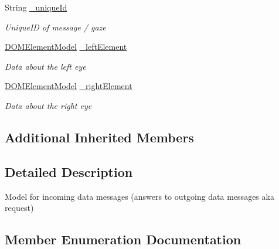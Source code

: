 \begin{DoxyCompactItemize}
String \hyperlink{class_web_analyzer_1_1_models_1_1_message_model_1_1_in_data_message_a65f5749322bf4e7ac43c6a4bf2702a55}{\+\_\+unique\+Id}
\begin{DoxyCompactList}\small\item\em Unique\+I\+D of message / gaze \end{DoxyCompactList}\item 
\hyperlink{class_web_analyzer_1_1_models_1_1_data_model_1_1_d_o_m_element_model}{D\+O\+M\+Element\+Model} \hyperlink{class_web_analyzer_1_1_models_1_1_message_model_1_1_in_data_message_a95db3eadcb298b75ea183c5bbf042a57}{\+\_\+left\+Element}
\begin{DoxyCompactList}\small\item\em Data about the left eye \end{DoxyCompactList}\item 
\hyperlink{class_web_analyzer_1_1_models_1_1_data_model_1_1_d_o_m_element_model}{D\+O\+M\+Element\+Model} \hyperlink{class_web_analyzer_1_1_models_1_1_message_model_1_1_in_data_message_a888d6b4c7153dd3e469cd963567fb7c7}{\+\_\+right\+Element}
\begin{DoxyCompactList}\small\item\em Data about the right eye \end{DoxyCompactList}\end{DoxyCompactItemize}
\subsection*{Additional Inherited Members}


\subsection{Detailed Description}
Model for incoming data messages (answers to outgoing data messages aka request) 



\subsection{Member Enumeration Documentation}
\hypertarget{class_web_analyzer_1_1_models_1_1_message_model_1_1_in_data_message_a5c01620a5429c5eec75477e614c96f94}{}
